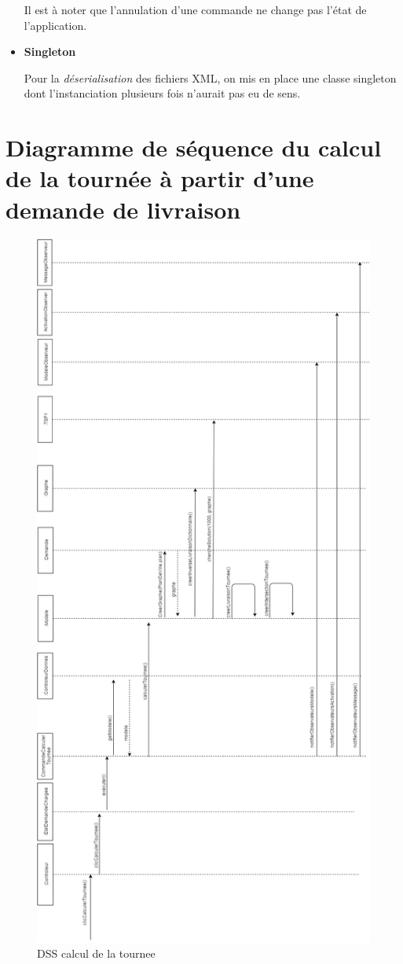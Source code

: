 \documentclass[10pt,a4paper]{book}
\begin{document}
\begin{itemize}
Il est à noter que l'annulation d'une commande ne change pas l'état de l'application.

\item \textbf{Singleton}

Pour la \textit{déserialisation} des fichiers XML, on mis en place une classe singleton dont l'instanciation plusieurs fois n'aurait pas eu de sens. 

\end{itemize}
\newpage
\section{Diagramme de séquence du calcul de la tournée à partir d'une demande de livraison}
\begin{figure}[h!]
    \centering
    \includegraphics[scale=0.28]{tournee2.png}
    \caption{DSS calcul de la tournee}
\end{figure}
\end{document}

